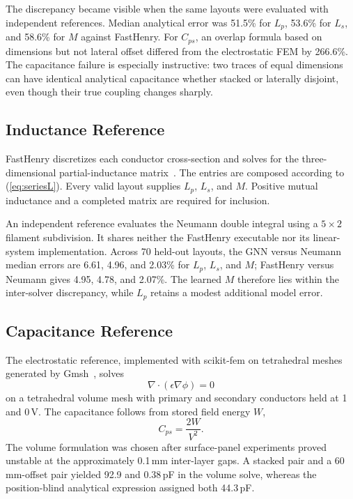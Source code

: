 \documentclass[letterpaper,twocolumn,9pt]{extarticle}
\newcommand{\Cps}{C_{ps}}
\newcommand{\Lp}{L_p}
\newcommand{\Ls}{L_s}
\newcommand{\Mut}{M}
\begin{document}
The discrepancy became visible when the same layouts were evaluated with independent references. Median analytical error was 51.5\% for $\Lp$, 53.6\% for $\Ls$, and 58.6\% for $\Mut$ against FastHenry. For $\Cps$, an overlap formula based on dimensions but not lateral offset differed from the electrostatic FEM by 266.6\%. The capacitance failure is especially instructive: two traces of equal dimensions can have identical analytical capacitance whether stacked or laterally disjoint, even though their true coupling changes sharply.

\subsection{Inductance Reference}
FastHenry discretizes each conductor cross-section and solves for the three-dimensional partial-inductance matrix~\cite{fasthenry}. The entries are composed according to (\ref{eq:seriesL}). Every valid layout supplies $\Lp$, $\Ls$, and $\Mut$. Positive mutual inductance and a completed matrix are required for inclusion.

An independent reference evaluates the Neumann double integral using a $5\times2$ filament subdivision. It shares neither the FastHenry executable nor its linear-system implementation. Across 70 held-out layouts, the GNN versus Neumann median errors are 6.61, 4.96, and 2.03\% for $\Lp$, $\Ls$, and $\Mut$; FastHenry versus Neumann gives 4.95, 4.78, and 2.07\%. The learned $\Mut$ therefore lies within the inter-solver discrepancy, while $\Lp$ retains a modest additional model error.

\subsection{Capacitance Reference}
The electrostatic reference, implemented with scikit-fem on tetrahedral meshes generated by Gmsh~\cite{skfem,gmsh}, solves
\begin{equation}
\nabla\!\cdot\!\left(\epsilon\nabla\phi\right)=0
\end{equation}
on a tetrahedral volume mesh with primary and secondary conductors held at 1 and 0\,V. The capacitance follows from stored field energy $W$,
\begin{equation}
\Cps=\frac{2W}{V^2}.
\end{equation}
The volume formulation was chosen after surface-panel experiments proved unstable at the approximately 0.1\,mm inter-layer gaps. A stacked pair and a 60\,mm-offset pair yielded 92.9 and 0.38\,pF in the volume solve, whereas the position-blind analytical expression assigned both 44.3\,pF.
\end{document}
